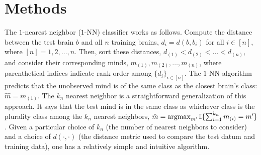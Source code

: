 \documentclass{article}
\newcommand{\argmax}{\operatornamewithlimits{argmax}}
\newcommand{\II}{\mathbb{I}}           %
\providecommand{\mc}[1]{\mathcal{#1}}
\providecommand{\mh}[1]{\hat{#1}}
\begin{document}


\section*{Methods}
\label{sec:methods}




The $1$-nearest neighbor ($1$-NN) classifier works as follows.  Compute the distance between the test brain  $b$ and all $n$ training brains, $d_i=d(b,b_i)$ for all $i \in [n]$, where $[n]=1,2,\ldots, n$.  Then, sort these distances, $d_{(1)} < d_{(2)} < \ldots < d_{(n)}$, and consider their corresponding minds, $m_{(1)}, m_{(2)}, \ldots, m_{(n)}$, where parenthetical indices indicate rank order among $\{d_i\}_{i\in[n]}$.  %
The $1$-NN algorithm predicts that the unobserved mind is of the same class as the closest brain's class: $\mh{m}=m_{(1)}$.  The $k_n$ nearest neighbor is a straightforward generalization of this approach.  It says that the test mind is in the same class as whichever class is the plurality class among the $k_n$ nearest neighbors, $\mh{m}=\argmax_{m'}\II\{\sum_{i=1}^{k_n} m_{(i)}=m'\}$.  Given a particular choice of $k_n$ (the number of nearest neighbors to consider) and a choice of $d(\cdot,\cdot)$ (the distance metric used to compare the test datum and training data), one has a relatively simple and intuitive algorithm.  
\end{document}
